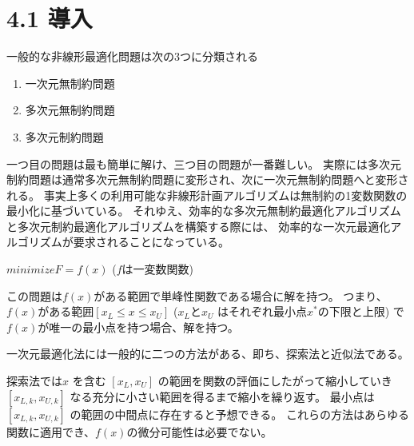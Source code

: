\section{4.1 導入}\label{4-1-}

一般的な非線形最適化問題は次の3つに分類される

\begin{enumerate}
\tightlist
\item
  一次元無制約問題
\item
  多次元無制約問題
\item
  多次元制約問題
\end{enumerate}

一つ目の問題は最も簡単に解け、三つ目の問題が一番難しい。
実際には多次元制約問題は通常多次元無制約問題に変形され、次に一次元無制約問題へと変形される。
事実上多くの利用可能な非線形計画アルゴリズムは無制約の1変数関数の最小化に基づいている。
それゆえ、効率的な多次元無制約最適化アルゴリズムと多次元制約最適化アルゴリズムを構築する際には、
効率的な一次元最適化アルゴリズムが要求されることになっている。

$ minimize F = f(x) $ ($f$は一変数関数)

この問題は$f(x)$がある範囲で単峰性関数である場合に解を持つ。
つまり、$ f(x) $がある範囲$ [x_L \leq x
\leq x_U] $ ($ x_L $と$ x_U $
はそれぞれ最小点$ x^* $の下限と上限) で$ f(x)
$が唯一の最小点を持つ場合、解を持つ。

一次元最適化法には一般的に二つの方法がある、即ち、探索法と近似法である。

探索法では$ x $ を含む $ [x_L , x_U] $
の範囲を関数の評価にしたがって縮小していき $ [ x_{L,k} ,
x_{U,k} ] $ なる充分に小さい範囲を得るまで縮小を繰り返す。
最小点は $ [ x_{L,k} , x_{U,k} ] $
の範囲の中間点に存在すると予想できる。
これらの方法はあらゆる関数に適用でき、$ f(x)
$の微分可能性は必要でない。
